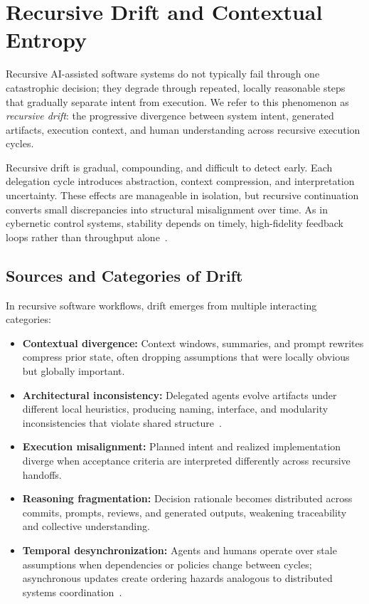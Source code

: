 \section{Recursive Drift and Contextual Entropy}
\label{sec:recursive-drift}

Recursive AI-assisted software systems do not typically fail through one catastrophic decision; they degrade through repeated, locally reasonable steps that gradually separate intent from execution. We refer to this phenomenon as \textit{recursive drift}: the progressive divergence between system intent, generated artifacts, execution context, and human understanding across recursive execution cycles.

Recursive drift is gradual, compounding, and difficult to detect early. Each delegation cycle introduces abstraction, context compression, and interpretation uncertainty. These effects are manageable in isolation, but recursive continuation converts small discrepancies into structural misalignment over time. As in cybernetic control systems, stability depends on timely, high-fidelity feedback loops rather than throughput alone~\cite{Wiener1948Cybernetics,Beer1972BrainFirm}.

\subsection{Sources and Categories of Drift}

In recursive software workflows, drift emerges from multiple interacting categories:
\begin{itemize}
  \item \textbf{Contextual divergence:} Context windows, summaries, and prompt rewrites compress prior state, often dropping assumptions that were locally obvious but globally important.
  \item \textbf{Architectural inconsistency:} Delegated agents evolve artifacts under different local heuristics, producing naming, interface, and modularity inconsistencies that violate shared structure~\cite{Parnas1972Modularization}.
  \item \textbf{Execution misalignment:} Planned intent and realized implementation diverge when acceptance criteria are interpreted differently across recursive handoffs.
  \item \textbf{Reasoning fragmentation:} Decision rationale becomes distributed across commits, prompts, reviews, and generated outputs, weakening traceability and collective understanding.
  \item \textbf{Temporal desynchronization:} Agents and humans operate over stale assumptions when dependencies or policies change between cycles; asynchronous updates create ordering hazards analogous to distributed systems coordination~\cite{Lamport1978TimeClocks,Vogels2009EventuallyConsistent}.
\end{itemize}


